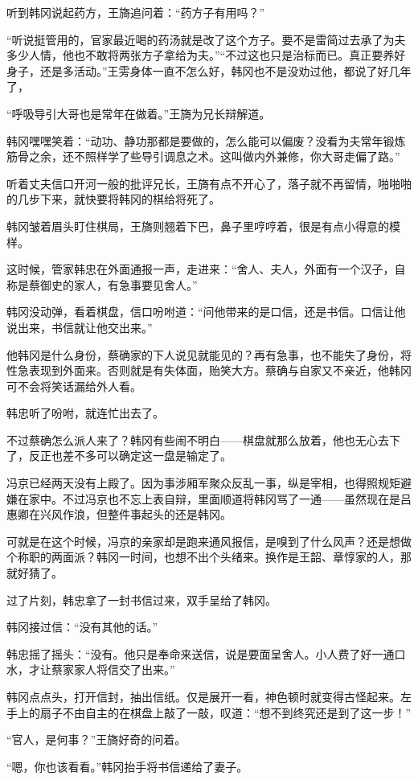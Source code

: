 听到韩冈说起药方，王旖追问着：“药方子有用吗？”

“听说挺管用的，官家最近喝的药汤就是改了这个方子。要不是雷简过去承了为夫多少人情，他也不敢将两张方子拿给为夫。”“不过这也只是治标而已。真正要养好身子，还是多活动。”王雱身体一直不怎么好，韩冈也不是没劝过他，都说了好几年了，

“呼吸导引大哥也是常年在做着。”王旖为兄长辩解道。

韩冈嘿嘿笑着：“动功、静功那都是要做的，怎么能可以偏废？没看为夫常年锻炼筋骨之余，还不照样学了些导引调息之术。这叫做内外兼修，你大哥走偏了路。”

听着丈夫信口开河一般的批评兄长，王旖有点不开心了，落子就不再留情，啪啪啪的几步下来，就快要将韩冈的棋给将死了。

韩冈皱着眉头盯住棋局，王旖则翘着下巴，鼻子里哼哼着，很是有点小得意的模样。

这时候，管家韩忠在外面通报一声，走进来：“舍人、夫人，外面有一个汉子，自称是蔡御史的家人，有急事要见舍人。”

韩冈没动弹，看着棋盘，信口吩咐道：“问他带来的是口信，还是书信。口信让他说出来，书信就让他交出来。”

他韩冈是什么身份，蔡确家的下人说见就能见的？再有急事，也不能失了身份，将性急表现到外面来。否则就是有失体面，贻笑大方。蔡确与自家又不亲近，他韩冈可不会将笑话漏给外人看。

韩忠听了吩咐，就连忙出去了。

不过蔡确怎么派人来了？韩冈有些闹不明白——棋盘就那么放着，他也无心去下了，反正也差不多可以确定这一盘是输定了。

冯京已经两天没有上殿了。因为事涉厢军聚众反乱一事，纵是宰相，也得照规矩避嫌在家中。不过冯京也不忘上表自辩，里面顺道将韩冈骂了一通——虽然现在是吕惠卿在兴风作浪，但整件事起头的还是韩冈。

可就是在这个时候，冯京的亲家却是跑来通风报信，是嗅到了什么风声？还是想做个称职的两面派？韩冈一时间，也想不出个头绪来。换作是王韶、章惇家的人，那就好猜了。

过了片刻，韩忠拿了一封书信过来，双手呈给了韩冈。

韩冈接过信：“没有其他的话。”

韩忠摇了摇头：“没有。他只是奉命来送信，说是要面呈舍人。小人费了好一通口水，才让蔡家家人将信交了出来。”

韩冈点点头，打开信封，抽出信纸。仅是展开一看，神色顿时就变得古怪起来。左手上的扇子不由自主的在棋盘上敲了一敲，叹道：“想不到终究还是到了这一步！”

“官人，是何事？”王旖好奇的问着。

“嗯，你也该看看。”韩冈抬手将书信递给了妻子。

